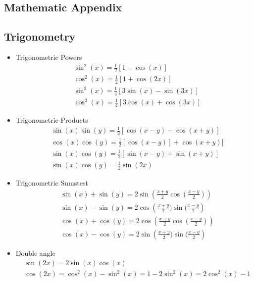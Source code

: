 \documentclass[a4paper, fontsize=8pt, landscape, DIV=1]{scrartcl}
\begin{document}
\begin{multicols*}{4}


  \vfill\null
  \pagebreak
  \section{Mathematic Appendix}
  \subsection{Trigonometry}
  \begin{itemize}
    \item Trigonometric Powers
    {\small\begin{align*}
      & \sin^2(x) = \frac{1}{2}[1-\cos(x)] \\
      & \cos^2(x) = \frac{1}{2}[1+\cos(2x)] \\
      & \sin^3(x) = \frac{1}{4}[3\sin(x)-\sin(3x)] \\
      & \cos^3(x) = \frac{1}{4}[3\cos(x) + \cos(3x)]
    \end{align*}}%

    \item Trigonometric Products
    {\small\begin{align*}
      & \sin(x)\sin(y) = \frac{1}{2}[\cos(x-y) - \cos(x+y)] \\
      &\cos(x)\cos(y) = \frac{1}{2}[\cos(x-y)] + \cos(x+y)] \\
      & \sin(x)\cos(y) = \frac{1}{2}[\sin(x-y) + \sin(x+y)] \\
      &\sin(x)\cos(y) = \frac{1}{2}\sin(2x)
    \end{align*}}%

    \item Trigonometric Sumstest
    {\small\begin{align*}
      & \sin(x) + \sin(y) = 2\sin\left(\frac{x+y}{2}\cos(\frac{x-y}{2})\right)\\
      & \sin(x)-\sin(y) = 2\cos\left(\frac{x+y}{2})\sin(\frac{x-y}{2}\right) \\
      & \cos(x) + \cos(y) = 2\cos\left(\frac{x+y}{2}\cos(\frac{x-y}{2})\right)\\
      & \cos(x)-\cos(y) = 2\sin\left(\frac{x+y}{2})\sin(\frac{x-y}{2}\right)
    \end{align*}}%

    \item Double angle
    {\small\begin{align*}
      & \sin(2x) = 2\sin(x)\cos(x) \\
      & \cos(2x) = \cos^2(x)-\sin^2(x) = 1-2\sin^2(x) = 2\cos^2(x) - 1
    \end{align*}}%


\end{itemize}
\end{multicols*}
\end{document}
